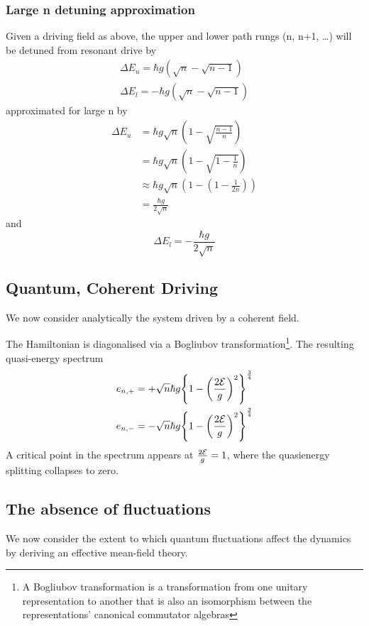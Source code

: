 \subsubsection{Large n detuning approximation}\cite{Alsing1990}
Given a driving field as above, the upper and lower path rungs (n, n+1, \dots) will be detuned from resonant drive by
\begin{align}
  \Delta E_u = \hbar g (\sqrt{n}-\sqrt{n-1}) \\
  \Delta E_l = -\hbar g (\sqrt{n}-\sqrt{n-1})
\end{align}
approximated for large n by
\begin{align}
  \Delta E_u &= \hbar g \sqrt{n} \left (1-\sqrt{\frac{n-1}{n}} \right ) \\
  &= \hbar g \sqrt{n} \left (1-\sqrt{1-\frac{1}{n}} \right ) \\
  & \approx \hbar g \sqrt{n} \left ( 1- \left ( 1 - \frac{1}{2n} \right ) \right ) \\
  &= \frac{\hbar g}{2 \sqrt{n}}
\end{align}
and
\begin{equation}
  \Delta E_l = -\frac{\hbar g}{2 \sqrt{n}}
\end{equation}
\subsection{Quantum, Coherent Driving}
We now consider analytically the system driven by a coherent field.

The Hamiltonian is diagonalised via a Bogliubov transformation\footnote{A Bogliubov transformation is a transformation from one unitary representation to another that is also an isomorphism between the representations' canonical commutator algebras}. The resulting quasi-energy spectrum
\begin{align}
  e_{n, +} &= + \sqrt{n} \hbar g {\left \{1 - {\left ({\frac{2\mathcal{E}}{g}} \right )}^2 \right \}}^{\frac{3}{4}} \\
  e_{n, -} &= - \sqrt{n} \hbar g {\left \{1 - {\left ({\frac{2\mathcal{E}}{g}} \right )}^2 \right \}}^{\frac{3}{4}}
\end{align}
A critical point in the spectrum appears at $\frac{2\mathcal{E}}{g} = 1$, where the quasienergy splitting collapses to zero.
\subsection{The absence of fluctuations}

We now consider the extent to which quantum fluctuations affect the dynamics by deriving an effective mean-field theory.

